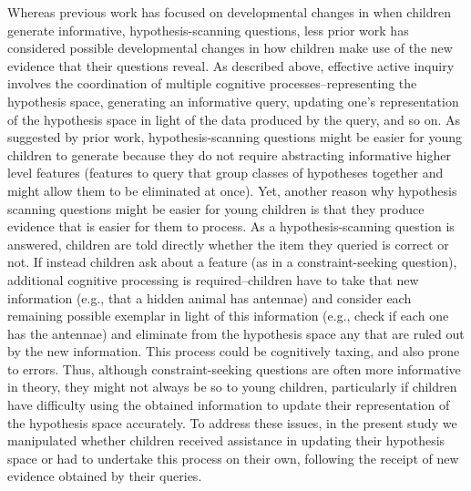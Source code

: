 \documentclass[man,floatsintext]{apa6}
\begin{document}
Whereas previous work has focused on developmental changes in when children generate informative, 
hypothesis-scanning questions, less prior work has considered possible developmental changes in how 
children make use of the new evidence that their questions reveal. As described above, effective active 
inquiry involves the coordination of multiple cognitive processes--representing the hypothesis space, 
generating an informative query, updating one's representation of the hypothesis space in light of the 
data produced by the query, and so on. As suggested by prior work, hypothesis-scanning questions might 
be easier for young children to generate because they do not require abstracting informative higher level 
features (features to query that group classes of hypotheses together and might allow them to be eliminated 
at once). Yet, another reason why hypothesis scanning questions might be easier for young children is that they produce evidence that is easier for them to process. As a hypothesis-scanning question is answered, children are told directly whether the item they queried is correct or not. If instead children ask about a feature (as in a constraint-seeking question), additional cognitive processing is required--children have to take that new information (e.g., that a hidden animal has antennae) and consider each remaining possible 
exemplar in light of this information (e.g., check if each one has the antennae) and eliminate from the 
hypothesis space any that are ruled out by the new information. This process could be cognitively taxing, 
and also prone to errors. Thus, although constraint-seeking questions are often more informative in 
theory, they might not always be so to young children, particularly if children have difficulty using the 
obtained information to update their representation of the hypothesis space accurately. To address 
these issues, in the present study we manipulated whether children received assistance in updating 
their hypothesis space or had to undertake this process on their own, following the receipt of new 
evidence obtained by their queries. 
\end{document}
